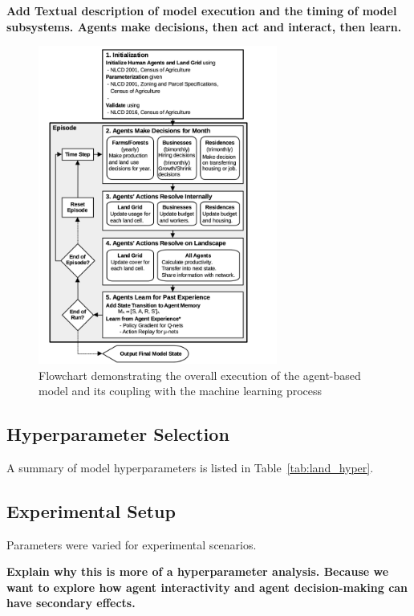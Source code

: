 \textbf{Add Textual description of model execution and the timing of
model subsystems. Agents make decisions, then act and interact, then learn.}

\begin{figure}
\centering
\includegraphics[width=0.7\textwidth]{figure/flowchart1.png}
\caption{Flowchart demonstrating the overall execution of the agent-based model
    and its coupling with the machine learning process}
\end{figure}

\subsection{Hyperparameter Selection}
\label{subsec:land_exp_hyper}

A summary of model hyperparameters is listed in Table~\ref{tab:land_hyper}.

\subsection{Experimental Setup}
\label{subsec:land_exp_setup}

Parameters were varied for experimental scenarios.

\textbf{Explain why this is more of a hyperparameter analysis. Because
we want to explore how agent interactivity and agent decision-making can
have secondary effects.}


